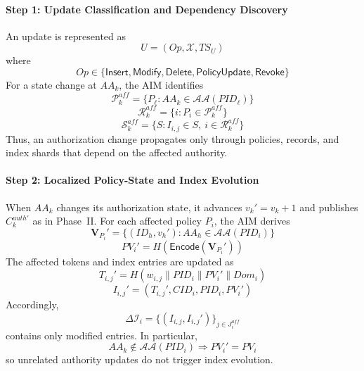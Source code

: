 \documentclass{ieeetj}
\theoremstyle{ieee-style}
\begin{document}
\paragraph*{Step 1: Update Classification and Dependency Discovery}

An update is represented as
\begin{equation}
U=(Op,\mathcal{X},TS_U)
\end{equation}
where
\begin{equation}
Op\in\{\mathsf{Insert},\mathsf{Modify},\mathsf{Delete},
\mathsf{PolicyUpdate},\mathsf{Revoke}\}
\end{equation}
For a state change at $AA_k$, the AIM identifies
\begin{equation}
\mathcal{P}_k^{aff}
=\{P_\ell:AA_k\in\mathcal{AA}(PID_\ell)\}
\end{equation}
\begin{equation}
\mathcal{R}_k^{aff}
=\{i:P_i\in\mathcal{P}_k^{aff}\}
\end{equation}
\begin{equation}
\mathcal{S}_k^{aff}
=\{S:I_{i,j}\in S,\ i\in\mathcal{R}_k^{aff}\}
\label{eq:dependency-closure}
\end{equation}
Thus, an authorization change propagates only through policies, records,
and index shards that depend on the affected authority.

\paragraph*{Step 2: Localized Policy-State and Index Evolution}

When $AA_k$ changes its authorization state, it advances
$v_k'=v_k+1$ and publishes $C_k^{auth\prime}$ as in Phase~II.
For each affected policy $P_i$, the AIM derives
\begin{equation}
\mathbf{V}_{P_i}'
=
\{(ID_h,v_h'):AA_h\in\mathcal{AA}(PID_i)\}
\end{equation}
\begin{equation}
PV_i'=H(\mathsf{Encode}(\mathbf{V}_{P_i}'))
\label{eq:updated-policy-state}
\end{equation}
The affected tokens and index entries are updated as
\begin{equation}
T_{i,j}'
=
H(w_{i,j}\parallel PID_i\parallel PV_i'\parallel Dom_i)
\end{equation}
\begin{equation}
I_{i,j}'
=
(T_{i,j}',CID_i,PID_i,PV_i')
\label{eq:updated-index}
\end{equation}
Accordingly,
\begin{equation}
\Delta\mathcal{I}_i
=
\{(I_{i,j},I_{i,j}')\}_{j\in J_i^{aff}}
\end{equation}
contains only modified entries. In particular,
\begin{equation}
AA_k\notin\mathcal{AA}(PID_i)
\Longrightarrow
PV_i'=PV_i
\label{eq:unaffected-policy}
\end{equation}
so unrelated authority updates do not trigger index evolution.
\end{document}
